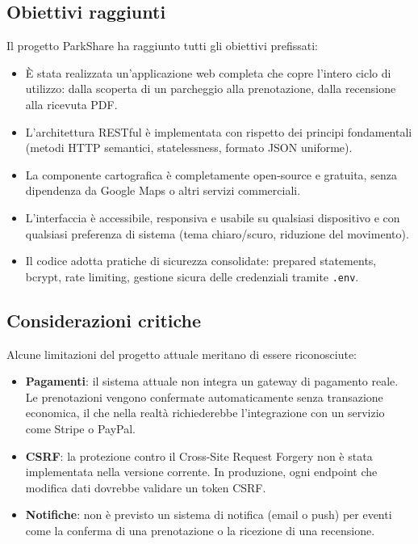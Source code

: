 \documentclass[12pt, a4paper]{article}
\begin{document}
\subsection{Obiettivi raggiunti}

Il progetto ParkShare ha raggiunto tutti gli obiettivi prefissati:

\begin{itemize}
    \item È stata realizzata un'applicazione web completa che copre l'intero
    ciclo di utilizzo: dalla scoperta di un parcheggio alla prenotazione,
    dalla recensione alla ricevuta PDF.

    \item L'architettura RESTful è implementata con rispetto dei principi
    fondamentali (metodi HTTP semantici, statelessness, formato JSON uniforme).

    \item La componente cartografica è completamente open-source e gratuita,
    senza dipendenza da Google Maps o altri servizi commerciali.

    \item L'interfaccia è accessibile, responsiva e usabile su qualsiasi
    dispositivo e con qualsiasi preferenza di sistema (tema chiaro/scuro,
    riduzione del movimento).

    \item Il codice adotta pratiche di sicurezza consolidate:
    prepared statements, bcrypt, rate limiting, gestione sicura delle
    credenziali tramite \texttt{.env}.
\end{itemize}

\subsection{Considerazioni critiche}

Alcune limitazioni del progetto attuale meritano di essere riconosciute:

\begin{itemize}
    \item \textbf{Pagamenti}: il sistema attuale non integra un gateway di
    pagamento reale. Le prenotazioni vengono confermate automaticamente
    senza transazione economica, il che nella realtà richiederebbe
    l'integrazione con un servizio come Stripe o PayPal.

    \item \textbf{CSRF}: la protezione contro il Cross-Site Request Forgery
    non è stata implementata nella versione corrente. In produzione,
    ogni endpoint che modifica dati dovrebbe validare un token CSRF.

    \item \textbf{Notifiche}: non è previsto un sistema di notifica
    (email o push) per eventi come la conferma di una prenotazione o
    la ricezione di una recensione.
\end{itemize}
\end{document}
